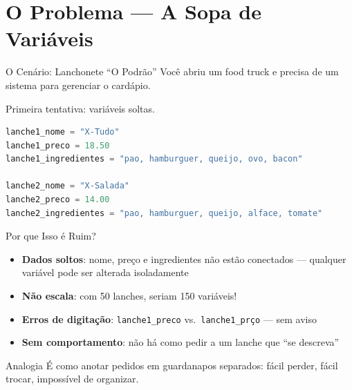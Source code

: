 \documentclass[aspectratio=169]{beamer}
\begin{document}
\section{O Problema --- A Sopa de Variáveis}

\begin{frame}[fragile]{O Cenário: Lanchonete ``O Podrão''}
  Você abriu um food truck e precisa de um sistema para gerenciar
  o cardápio.

  \vspace{0.3cm}
  Primeira tentativa: variáveis soltas.

  \begin{lstlisting}[language=Python]
lanche1_nome = "X-Tudo"
lanche1_preco = 18.50
lanche1_ingredientes = "pao, hamburguer, queijo, ovo, bacon"

lanche2_nome = "X-Salada"
lanche2_preco = 14.00
lanche2_ingredientes = "pao, hamburguer, queijo, alface, tomate"
  \end{lstlisting}
\end{frame}

\begin{frame}{Por que Isso é Ruim?}
  \begin{itemize}
    \item \textbf{Dados soltos}: nome, preço e ingredientes não estão
          conectados --- qualquer variável pode ser alterada isoladamente
    \item \textbf{Não escala}: com 50 lanches, seriam 150 variáveis!
    \item \textbf{Erros de digitação}: \texttt{lanche1\_preco} vs.\
          \texttt{lanche1\_prço} --- sem aviso
    \item \textbf{Sem comportamento}: não há como pedir a um lanche
          que ``se descreva''
  \end{itemize}

  \vspace{0.5cm}
  \begin{alertblock}{Analogia}
    É como anotar pedidos em guardanapos separados:
    fácil perder, fácil trocar, impossível de organizar.
  \end{alertblock}
\end{frame}
\end{document}
